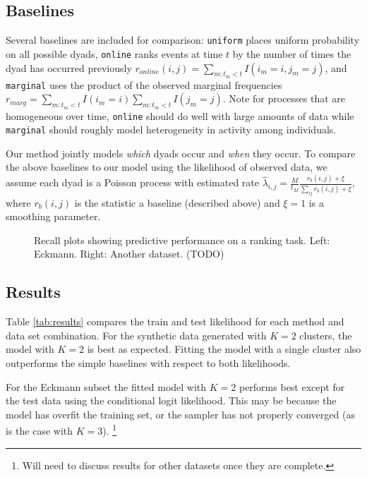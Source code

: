 \documentclass{article}
\begin{document}


\subsection{Baselines}

Several baselines are included for comparison: \texttt{uniform} places uniform probability on all possible dyads, \texttt{online} ranks events at time $t$ by the number of times the dyad has occurred previously $r_{online}(i,j) = \sum_{m:t_m < t} I(i_m=i,j_m=j)$, and \texttt{marginal} uses the product of the observed marginal frequencies $r_{marg} = \sum_{m:t_m < t} I(i_m=i) \sum_{m:t_m < t} I(j_m=j)$.  Note for processes that are homogeneous over time, \texttt{online} should do well with large amounts of data while \texttt{marginal} should roughly model heterogeneity in activity among individuals.  

Our method jointly models \emph{which} dyads occur and \emph{when} they occur.  To compare the above baselines to our model using the likelihood of observed data, we assume each dyad is a Poisson process with estimated  rate $\hat{\lambda}_{i,j} = \frac{M}{t_M} \frac{r_{b}(i,j) + \xi}{\sum_{ij} r_{b}(i,j) + \xi}$, where $r_b(i,j)$ is the statistic a baseline (described above) and $\xi=1$ is a smoothing parameter.



\begin{figure}[t]
\center
\fbox{\rule[-.5cm]{0cm}{4cm} \rule[-.5cm]{4cm}{0cm}}
\fbox{\rule[-.5cm]{0cm}{4cm} \rule[-.5cm]{4cm}{0cm}}
\fbox{\rule[-.5cm]{0cm}{4cm} \rule[-.5cm]{4cm}{0cm}}
\caption{Recall plots showing predictive performance on a ranking task.  Left: Eckmann.  Right: Another dataset.  (TODO)}
\label{fig:recall}
\end{figure}

\subsection{Results}

 Table \ref{tab:results} compares the train and test likelihood for each method and data set combination.  For the synthetic data generated with $K=2$ clusters, the model with $K=2$ is best as expected.  Fitting the model with a single cluster also outperforms the simple baselines with respect to both likelihoods.  

For the Eckmann subset the fitted model with $K=2$ performs best except for the test data using the conditional logit likelihood.  This may be because the model has overfit the training set, or the sampler has not properly converged (as is the case with $K=3$).  \footnote{Will need to discuss results for other datasets once they are complete.}
\end{document}
